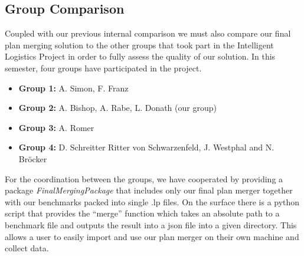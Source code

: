 \documentclass{llncs}
\begin{document}
\subsection{Group Comparison}
Coupled with our previous internal comparison we must also compare our final plan merging solution to the other groups that took part in the Intelligent Logistics Project in order to fully assess the quality of our solution. In this semester, four groups have participated in the project.
\begin{itemize}
    \item \textbf{Group 1:} A. Simon, F. Franz\cite{project2}
    \item \textbf{Group 2:} A. Bishop, A. Rabe, L. Donath (our group)\cite{project1}
    \item \textbf{Group 3:} A. Romer\cite{project3}
    \item \textbf{Group 4:} D. Schreitter Ritter von Schwarzenfeld, J. Westphal and N. Bröcker\cite{project4}
\end{itemize}

For the coordination between the groups, we have cooperated by providing a package \emph{FinalMergingPackage}\cite{project1} that includes only our final plan merger together with our benchmarks packed into single .lp files. On the surface there is a python script that provides the ``merge'' function which takes an absolute path to a benchmark file and outputs the result into a json file into a given directory. This allows a user to easily import and use our plan merger on their own machine and collect data.
\end{document}
